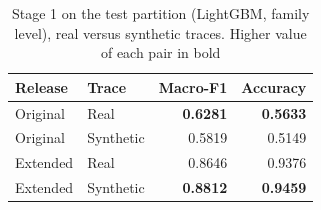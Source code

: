 \begin{table}[!t]
\caption{Stage 1 on the test partition (LightGBM, family level), real
versus synthetic traces. Higher value of each pair in bold}
\label{tab:real_synthetic}
\centering
\begin{tabular}{llrr}
\toprule
Release & Trace & Macro-F1 & Accuracy \\
\midrule
Original & Real & \textbf{0.6281} & \textbf{0.5633} \\
Original & Synthetic & 0.5819 & 0.5149 \\
Extended & Real & 0.8646 & 0.9376 \\
Extended & Synthetic & \textbf{0.8812} & \textbf{0.9459} \\
\bottomrule
\end{tabular}
\end{table}
